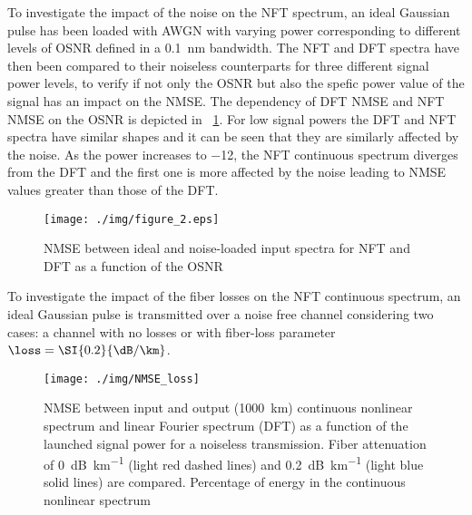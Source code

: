 \begin{extendedthesis}

To investigate the impact of the noise on the \ac{NFT} spectrum, an ideal Gaussian
pulse has been loaded with \ac{AWGN} with varying power corresponding to different levels of \ac{OSNR}
defined in a \SI{0.1}{\nm} bandwidth. The \ac{NFT} and \ac{DFT} spectra have then been
compared to their noiseless counterparts
for three different signal power levels, to verify if not only the \ac{OSNR} but also the spefic power value of the signal has an impact on the \ac{NMSE}. The dependency of \ac{DFT} \ac{NMSE}
and \ac{NFT} \ac{NMSE} on the \ac{OSNR} is depicted in \figurename~\ref{fig:osnrSweep}.
For low signal powers the \ac{DFT} and \ac{NFT} spectra have similar shapes and it can
be seen that they are similarly affected by the noise. As the power increases to
\SI{-12}{ \dBm}, the \ac{NFT} continuous spectrum diverges from the \ac{DFT} and
the first one is more affected by the noise leading to \ac{NMSE} values greater
than those of the \ac{DFT}.



\begin{figure}[t]
\centering
    \texttt{[image: ./img/figure\_2.eps]}
    \caption{\ac{NMSE} between ideal and noise-loaded input spectra for \ac{NFT}
    and \ac{DFT} as a function of the OSNR}
    \label{fig:osnrSweep}
\end{figure}

\end{extendedthesis}

To investigate the impact of the fiber losses on the \ac{NFT} continuous spectrum, an ideal Gaussian pulse is transmitted over a noise free channel considering two cases: a channel with no losses or with fiber-loss parameter $\loss =  \SI{0.2}{\dB/\km}$.

\begin{figure}[t]
  \centering
  \texttt{[image: ./img/NMSE\_loss]}
   \caption{ \ac{NMSE} between input and output (\SI{1000}{km}) continuous nonlinear spectrum and linear Fourier spectrum (\ac{DFT}) as a function of the launched signal power
for a noiseless transmission. Fiber attenuation of \SI{0}{\dB\per\km} (light red dashed lines) and \SI{0.2}{\dB\per\km} (light blue solid lines) are compared.  Percentage of energy
in the continuous nonlinear spectrum}
    \label{fig:powersweep}
\end{figure}

